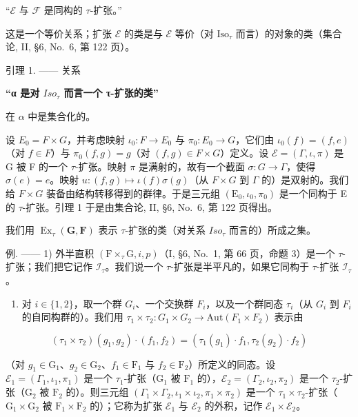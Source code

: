 “\(\mathcal{E}\) 与 \(\mathcal{F}\) 是同构的 \(\tau\)-扩张。”

这是一个等价关系；扩张 \(\mathcal{E}\) 的类是与 \(\mathcal{E}\) 等价（对 \(\mathrm{Iso}_{\tau}\) 而言）的对象的类（集合论, II, §6, No.~6, 第 122 页）。

引理 1. —— 关系

\textbf{\texorpdfstring{“α 是对 \(Iso_{\tau}\) 而言一个 τ-扩张的类”}{“α 是对 Iso\_\{\textbackslash tau\} 而言一个 τ-扩张的类”}}

在 \(\alpha\) 中是集合化的。

设 \(E_{0}=F\times G\)，并考虑映射 \(\iota_{0}:F\to E_{0}\) 与 \(\pi_{0}:E_{0}\to G\)，它们由 \(\iota_{0}(f)=(f,e)\)（对 \(f\in F\)）与 \(\pi_{0}(f,g)=g\)（对 \((f,g)\in F\times G\)）定义。设 \(\mathcal{E}=(\Gamma,\iota,\pi)\) 是 G 被 F 的一个 \(\tau\)-扩张。映射 \(\pi\) 是满射的，故有一个截面 \(\sigma:G\to\Gamma\)，使得 \(\sigma(e)=e\)。映射 \(u:(f,g)\mapsto\iota(f)\sigma(g)\)（从 \(F\times G\) 到 \(\Gamma\) 的）是双射的。我们给 \(F\times G\) 装备由结构转移得到的群律。于是三元组 \((\mathrm{E}_{0},\iota_{0},\pi_{0})\) 是一个同构于 E 的 \(\tau\)-扩张。引理 1 于是由集合论, II, §6, No.~6, 第 122 页得出。

我们用 \(\operatorname{Ex}_{\tau}(\mathbf{G},\mathbf{F})\) 表示 \(\tau\)-扩张的类（对关系 \(Iso_{\tau}\) 而言的）所成之集。

例. —— 1) 外半直积 \((\mathrm{F} \times_{\tau} \mathrm{G}, i, p)\)（I, §6, No.~1, 第 66 页，命题 3）是一个 \(\tau\)-扩张；我们把它记作 \(\mathcal{I}_{\tau}\)。我们说一个 \(\tau\)-扩张是半平凡的，如果它同构于 \(\tau\)-扩张 \(\mathcal{I}_{\tau}\)。

\begin{enumerate}
\def\labelenumi{\arabic{enumi})}
\setcounter{enumi}{1}
\tightlist
\item
  对 \(i \in \{1,2\}\)，取一个群 \(G_{i}\)、一个交换群 \(F_{i}\)，以及一个群同态 \(\tau_{i}\)（从 \(G_{i}\) 到 \(F_{i}\) 的自同构群的）。我们用 \(\tau_{1} \times \tau_{2}: G_{1} \times G_{2} \to \text{Aut}(F_{1} \times F_{2})\) 表示由
\end{enumerate}

\[
(\tau_ {1} \times \tau_ {2}) (g _ {1}, g _ {2}) \cdot (f _ {1}, f _ {2}) = (\tau_ {1} (g _ {1}) \cdot f _ {1}, \tau_ {2} (g _ {2}) \cdot f _ {2})
\]

（对 \(g_{1} \in \mathrm{G}_{1}\)、\(g_{2} \in \mathrm{G}_{2}\)、\(f_{1} \in \mathrm{F}_{1}\) 与 \(f_{2} \in \mathrm{F}_{2}\)）所定义的同态。设 \(\mathcal{E}_1 = (\Gamma_1, \iota_1, \pi_1)\) 是一个 \(\tau_1\)-扩张（\(\mathrm{G}_1\) 被 \(\mathrm{F}_1\) 的），\(\mathcal{E}_2 = (\Gamma_2, \iota_2, \pi_2)\) 是一个 \(\tau_2\)-扩张（\(\mathrm{G}_2\) 被 \(\mathrm{F}_2\) 的）。则三元组 \((\Gamma_1 \times \Gamma_2, \iota_1 \times \iota_2, \pi_1 \times \pi_2)\) 是一个 \(\tau_1 \times \tau_2\)-扩张（\(\mathrm{G}_1 \times \mathrm{G}_2\) 被 \(\mathrm{F}_1 \times \mathrm{F}_2\) 的）；它称为扩张 \(\mathcal{E}_1\) 与 \(\mathcal{E}_2\) 的外积，记作 \(\mathcal{E}_1 \times \mathcal{E}_2\)。

